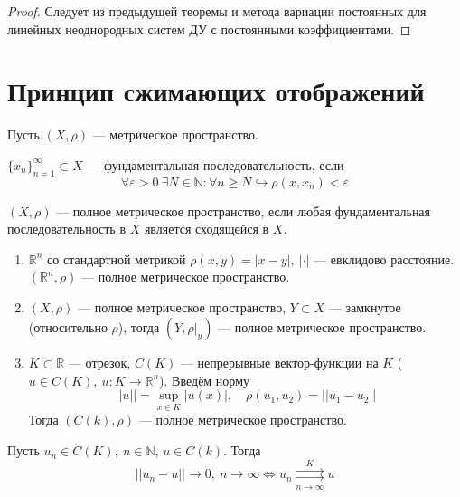 \documentclass[11pt]{article}
\begin{document}
\begin{proof}
    Следует из предыдущей теоремы и метода вариации постоянных для линейных неоднородных систем ДУ с постоянными коэффициентами.
\end{proof}

\section{Принцип сжимающих отображений}

Пусть $(X, \rho)$ --- метрическое пространство.
\begin{definition}
    $\{x_n\}_{n = 1}^\infty \subset X$ --- фундаментальная последовательность, если \[\forall \varepsilon > 0 \ \exists N \in \mathbb{N}: \forall n \geq N 
    \hookrightarrow \rho(x, x_n) < \varepsilon\]
\end{definition}

\begin{definition}
    $(X, \rho)$ --- полное метрическое пространство, если любая фундаментальная последовательность в $X$ является сходящейся в $X$.
\end{definition}

\begin{example}
    \leavevmode
    \begin{enumerate}
        \item $\mathbb{R}^n$ со стандартной метрикой $\rho(x, y) = |x - y|, \ |\cdot|$ --- евклидово расстояние. $(\mathbb{R}^n, \rho)$ --- полное 
        метрическое пространство.
        \item $(X, \rho)$ --- полное метрическое пространство, $Y \subset X$ --- замкнутое (относительно $\rho$), тогда $(Y, \rho|_y)$ --- полное 
        метрическое пространство. 
        \item $K \subset \mathbb{R}$ --- отрезок, $C(K)$ --- непрерывные вектор-функции на $K$ ($u \in C(K), \ u : K \to \mathbb{R}^n$). Введём норму 
        \[||u|| = \sup_{x \in K} |u(x)|, \quad \rho(u_1, u_2) = ||u_1 - u_2||\] Тогда $(C(k), \rho)$ --- полное метрическое пространство.
    \end{enumerate}
\end{example}

\begin{remark}
    Пусть $u_n \in C(K), \ n \in \mathbb{N}$, $u \in C(k)$. Тогда \[||u_n - u|| \to 0, \ n \to \infty \Longleftrightarrow
    u_n \underset{n \to \infty}{\overset{K}{\rightrightarrows}} u\]
\end{remark}
\end{document}

